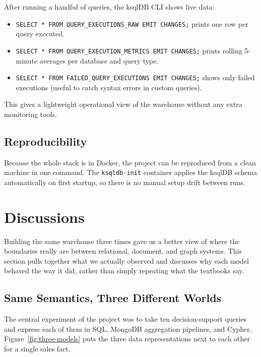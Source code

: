\documentclass[11pt,a4paper]{article}
\begin{document}
After running a handful of queries, the ksqlDB CLI shows live data:

\begin{itemize}[leftmargin=*]
    \item \texttt{SELECT * FROM QUERY\_EXECUTIONS\_RAW EMIT CHANGES;} prints
          one row per query executed.
    \item \texttt{SELECT * FROM QUERY\_EXECUTION\_METRICS EMIT CHANGES;}
          prints rolling 5-minute averages per database and query type.
    \item \texttt{SELECT * FROM FAILED\_QUERY\_EXECUTIONS EMIT CHANGES;}
          shows only failed executions (useful to catch syntax errors in
          custom queries).
\end{itemize}

This gives a lightweight operational view of the warehouse without any
extra monitoring tools.

\subsection{Reproducibility}

Because the whole stack is in Docker, the project can be reproduced from a
clean machine in one command. The \texttt{ksqldb-init} container applies the
ksqlDB schema automatically on first startup, so there is no manual setup
drift between runs.

\section{Discussions}\label{sec:discussion}

Building the same warehouse three times gave us a better view of where
the boundaries really are between relational, document, and graph
systems. This section pulls together what we actually observed and
discusses why each model behaved the way it did, rather than simply
repeating what the textbooks say.

\subsection{Same Semantics, Three Different Worlds}

The central experiment of the project was to take ten decision-support
queries and express each of them in SQL, MongoDB aggregation pipelines,
and Cypher. Figure~\ref{fig:three-models} puts the three data
representations next to each other for a single sales fact.
\end{document}
